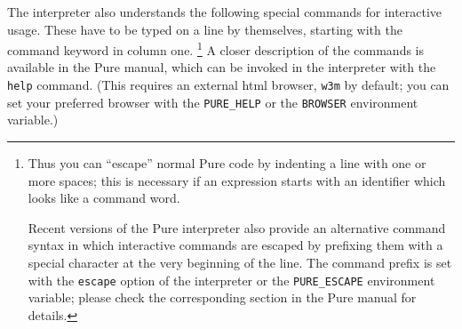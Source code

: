 \documentclass[a4paper,12pt]{article}
\begin{document}
The interpreter also understands the following special commands for interactive usage. These have to be typed on a line by themselves, starting with the command keyword in column one.%
\footnote{Thus you can ``escape'' normal Pure code by indenting a line with one or more spaces; this is necessary if an expression starts with an identifier which looks like a command word.

Recent versions of the Pure interpreter also provide an alternative command syntax in which interactive commands are escaped by prefixing them with a special character at the very beginning of the line. The command prefix is set with the \texttt{\textendash\textendash escape} option of the interpreter or the \texttt{PURE\_ESCAPE} environment variable; please check the corresponding section in the Pure manual for details.}
A closer description of the commands is available in the Pure manual, which can be invoked in the interpreter with the \verb|help| command. (This requires an external html browser, \texttt{w3m} by default; you can set your preferred browser with the \texttt{PURE\_HELP} or the \texttt{BROWSER} environment variable.)
\end{document}
